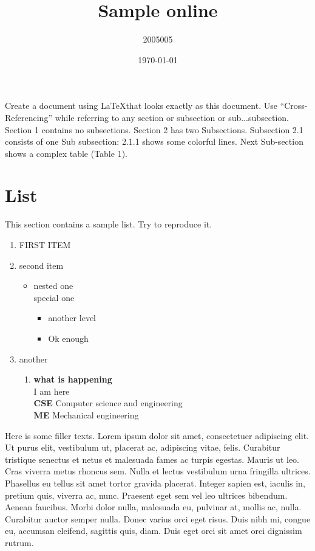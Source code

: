 \documentclass[18pt]{article}
\title{Sample online}
\author{2005005}
\date{\today}
\begin{document}
  \maketitle
  Create a document using \LaTeX that looks exactly as this document. Use
“Cross-Referencing” while referring to any section or subsection or sub...subsection.
Section 1 contains no subsections. Section 2 has two Subsections. Subsection
2.1 consists of one Sub subsection: 2.1.1 shows some colorful lines. Next Sub-section shows a complex table (Table 1).
\section{List}
   This section contains a sample list. Try to reproduce it.
   \begin{enumerate}
       \item \uppercase{first item}
       \item second item
       \begin{itemize}
           \item nested one\\ special one
           \begin{itemize}
               \item another level
               \item Ok enough
           \end{itemize}
       \end{itemize}
       \item another
       \begin{enumerate}
           \item \textbf{what is happening}\\I am here\\ \textbf{CSE} Computer science and engineering\\ \textbf{ME} Mechanical engineering
       \end{enumerate}
   \end{enumerate}
  Here is some filler texts. Lorem ipsum dolor sit amet, consectetuer adipiscing
elit. Ut purus elit, vestibulum ut, placerat ac, adipiscing vitae, felis.  Curabitur
tristique senectus et netus et malesuada fames ac turpis egestas. Mauris ut
leo. Cras viverra metus rhoncus sem. Nulla et lectus vestibulum urna fringilla
ultrices. Phasellus eu tellus sit amet tortor gravida placerat. Integer sapien
est, iaculis in, pretium quis, viverra ac, nunc. Praesent eget sem vel leo ultrices bibendum. Aenean faucibus. Morbi dolor nulla, malesuada eu, pulvinar at,
mollis ac, nulla. Curabitur auctor semper nulla. Donec varius orci eget risus.
Duis nibh mi, congue eu, accumsan eleifend, sagittis quis, diam. Duis eget orci
sit amet orci dignissim rutrum.
\end{document}
